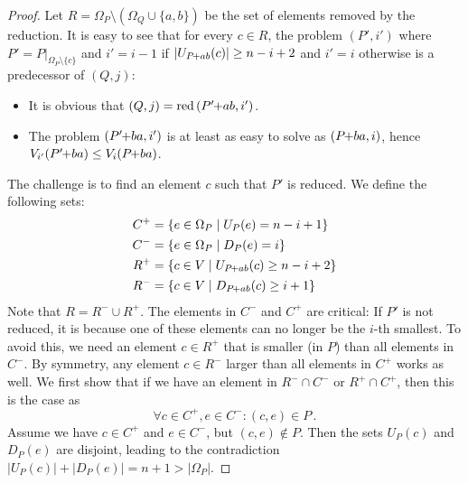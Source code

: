 \documentclass[a4paper,UKenglish,cleveref, autoref, thm-restate]{lipics-v2021}
\newcommand{\pchild}[3]{{#1}\kern-1pt{+}{#2}{#3}}
\newcommand{\reduced}[1]{\operatorname{red}{#1}}
\newcommand{\less}[2]{D_{#1}(#2)}
\newcommand{\greater}[2]{U_{#1}(#2)}
\begin{document}
\begin{proof}
  Let $R = \Omega_P \setminus (\Omega_Q \cup \{a, b\})$ be the set of elements removed by the reduction.
  It is easy to see that for every $c \in R$, the problem $(P', i')$ where $P' = P|_{\Omega_P \setminus \{c\}}$ and $i' = i - 1$ if $|\greater{\pchild{P}{a}{b}}{c}| \ge n - i + 2$ and $i' = i$ otherwise is a predecessor of $(Q, j)$:
  \begin{itemize}
    \item It is obvious that $(Q, j) = \reduced{(\pchild{P'}{a}{b}, i')}$.
    \item The problem $(\pchild{P'}{b}{a}, i')$ is at least as easy to solve as $(\pchild{P}{b}{a}, i)$, hence $V_{i'}(\pchild{P'}{b}{a}) \leq V_i(\pchild{P}{b}{a})$.
  \end{itemize}
  The challenge is to find an element $c$ such that $P'$ is reduced.
  We define the following sets:
  \begin{align*}
    C^+ & = \{e \in \Omega_P \mid \greater{P}{e} = n - i + 1\}            \\
    C^- & = \{e \in \Omega_P \mid \less{P}{e} = i \}                      \\
    R^+ & = \{c \in V \mid \greater{\pchild{P}{a}{b}}{c} \ge n - i + 2 \} \\
    R^- & = \{c \in V \mid \less{\pchild{P}{a}{b}}{c} \ge i + 1 \}
  \end{align*}
  Note that $R = R^- \cup R^+$.
  The elements in $C^-$ and $C^+$ are critical:
  If $P'$ is not reduced, it is because one of these elements can no longer be the $i$-th smallest.
  To avoid this, we need an element $c \in R^+$ that is smaller (in $P$) than all elements in $C^-$.
  By symmetry, any element $c \in R^-$ larger than all elements in $C^+$ works as well.
  We first show that if we have an element in $R^- \cap C^-$ or $R^+ \cap C^+$, then this is the case as
  \begin{equation}
    \forall c \in C^+, e \in C^- \colon (c, e) \in P\,\text{.}
  \end{equation}
  Assume we have $c \in C^+$ and $e \in C^-$, but $(c, e) \notin P$.
  Then the sets $\greater{P}{c}$ and $\less{P}{e}$ are disjoint, leading to the contradiction $|\greater{P}{c}| + |\less{P}{e}| = n + 1 > |\Omega_P|$.


\end{proof}
\end{document}
